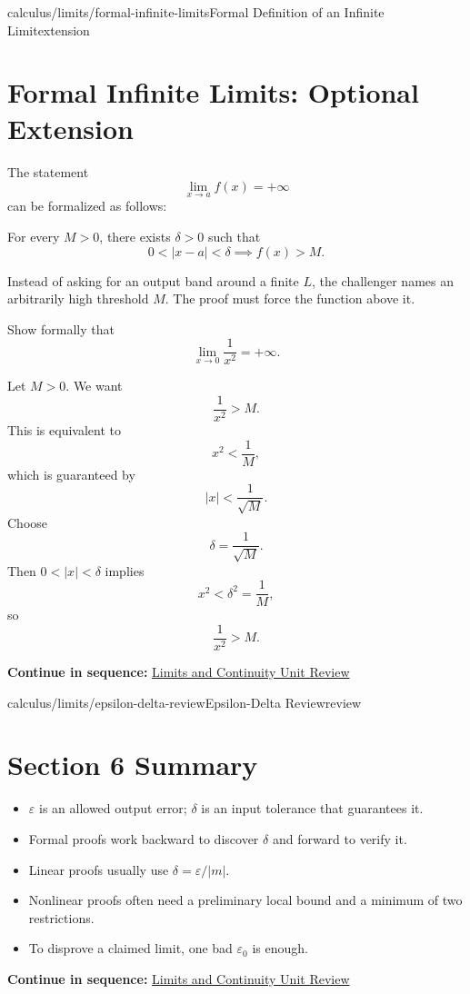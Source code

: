 \documentclass[11pt,openany]{book}
\theoremstyle{bgplain}
\newcommand{\webnext}[2]{%
  \par\addvspace{1.2em}\noindent{\color{BGLine}\rule{\textwidth}{0.35pt}}\par\smallskip
  {\small\color{BGGray}\textbf{Continue in sequence:} \hyperlink{web:#1}{#2}}\par
}
\newcommand{\eps}{\varepsilon}
\begin{document}
\begin{webpage}{calculus/limits/formal-infinite-limits}{Formal Definition of an Infinite Limit}{extension}
\section{Formal Infinite Limits: Optional Extension}

The statement
\[
  \lim_{x\to a}f(x)=+\infty
\]
can be formalized as follows:

\begin{bgdefinition}[title={Formal Positive Infinite Limit}]
For every \(M>0\), there exists \(\delta>0\) such that
\[
  0<|x-a|<\delta\implies f(x)>M.
\]
\end{bgdefinition}

Instead of asking for an output band around a finite \(L\), the challenger names an arbitrarily high threshold \(M\). The proof must force the function above it.

\begin{bgguided}[title={\(1/x^2\to+\infty\)}]
Show formally that
\[
  \lim_{x\to0}\frac1{x^2}=+\infty.
\]

\begin{bgsolution}
Let \(M>0\). We want
\[
  \frac1{x^2}>M.
\]
This is equivalent to
\[
  x^2<\frac1M,
\]
which is guaranteed by
\[
  |x|<\frac1{\sqrt M}.
\]
Choose
\[
  \delta=\frac1{\sqrt M}.
\]
Then \(0<|x|<\delta\) implies
\[
  x^2<\delta^2=\frac1M,
\]
so
\[
  \frac1{x^2}>M.
\]
\end{bgsolution}
\end{bgguided}
\webnext{calculus/limits/unit-review}{Limits and Continuity Unit Review}
\end{webpage}

\begin{webpage}{calculus/limits/epsilon-delta-review}{Epsilon-Delta Review}{review}
\section*{Section 6 Summary}

\begin{bgsummary}
\begin{itemize}
  \item \(\eps\) is an allowed output error; \(\delta\) is an input tolerance that guarantees it.
  \item Formal proofs work backward to discover \(\delta\) and forward to verify it.
  \item Linear proofs usually use \(\delta=\eps/|m|\).
  \item Nonlinear proofs often need a preliminary local bound and a minimum of two restrictions.
  \item To disprove a claimed limit, one bad \(\eps_0\) is enough.
\end{itemize}
\end{bgsummary}
\webnext{calculus/limits/unit-review}{Limits and Continuity Unit Review}
\end{webpage}
\end{document}

